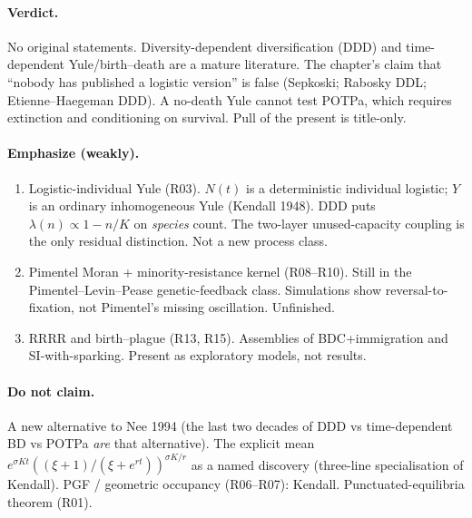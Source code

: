 \documentclass[11pt,a4paper]{report}
\begin{document}
\paragraph{Verdict.}
No original statements. Diversity-dependent diversification (DDD) and
time-dependent Yule/birth--death are a mature literature. The chapter's
claim that ``nobody has published a logistic version'' is false
(Sepkoski; Rabosky DDL; Etienne--Haegeman DDD). A no-death Yule cannot
test POTPa, which requires extinction and conditioning on survival. Pull
of the present is title-only.

\paragraph{Emphasize (weakly).}
\begin{enumerate}
\item Logistic-individual Yule (R03). \(N(t)\) is a deterministic
  individual logistic; \(Y\) is an ordinary inhomogeneous Yule (Kendall
  1948). DDD puts \(\lambda(n)\propto 1-n/K\) on \emph{species} count.
  The two-layer unused-capacity coupling is the only residual
  distinction. Not a new process class.
\item Pimentel Moran + minority-resistance kernel (R08--R10). Still in
  the Pimentel--Levin--Pease genetic-feedback class. Simulations show
  reversal-to-fixation, not Pimentel's missing oscillation. Unfinished.
\item RRRR and birth--plague (R13, R15). Assemblies of BDC+immigration
  and SI-with-sparking. Present as exploratory models, not results.
\end{enumerate}

\paragraph{Do not claim.}
A new alternative to Nee 1994 (the last two decades of DDD vs
time-dependent BD vs POTPa \emph{are} that alternative). The explicit
mean \(e^{\sigma Kt}((\xi+1)/(\xi+e^{rt}))^{\sigma K/r}\) as a named
discovery (three-line specialisation of Kendall). PGF / geometric
occupancy (R06--R07): Kendall. Punctuated-equilibria theorem (R01).
\end{document}
